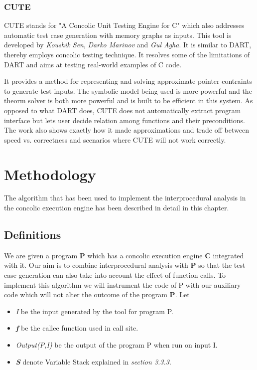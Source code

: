 \documentclass[12pt,oneside]{book}
\begin{document}
\newpage


\subsection{CUTE}
CUTE stands for "A Concolic Unit Testing Engine for C" which also addresses automatic test case generation with memory graphs as inputs. This tool is developed by \textit{Koushik Sen}, \textit{Darko Marinov} and \textit{Gul Agha}. It is similar to DART, thereby employs concolic testing technique. It resolves some of the limitations of DART and aims at testing real-world examples of C code.

It provides a method for representing and solving approximate pointer contraints to generate test inputs. The symbolic model being used is more powerful and the theorm solver is both more powerful and is built to be efficient in this system. As opposed to what DART does, CUTE does not automatically extract program interface but lets user decide relation among functions and their preconditions. The work also shows exactly how it made approximations and trade off between speed vs. correctness and scenarios where CUTE will not work correctly.






\newpage


\chapter{Methodology}
The algorithm that has been used to implement the interprocedural analysis in the concolic execution engine has been described in detail in this chapter.

\section{Definitions}

We are given a program \textbf{P} which has a concolic execution engine \textbf{C} integrated with it. Our aim is to combine interprocedural analysis with \textbf{P} so that the test case generation can also take into account the effect of function calls. To implement this algorithm we will instrument the code of P with our auxiliary code which will not alter the outcome of the program \textbf{P}. Let 

\begin{itemize}
 \item \textit{I} be the input generated by the tool for program P.
  \item \textit{\textbf{f}} be the callee function used in call site.
 \item \textit{Output(P,I)} be the output of the program P when run on input I. 
 \item \textit{\textbf{S}} denote Variable Stack explained in \textit{section 3.3.3}.  
\end{itemize}
\end{document}
